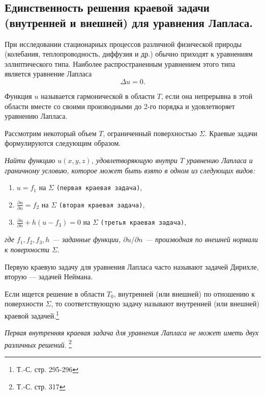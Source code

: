 \subsection{Единственность решения краевой задачи (внутренней и внешней) для уравнения Лапласа.}

При исследовании стационарных процессов различной физической природы (колебания, теплопроводность, диффузия и др.) обычно приходят к уравнениям эллиптического типа. Наиболее распространенным уравнением этого типа является уравнение Лапласа
\begin{equation*}
	\Delta u = 0. 
\end{equation*}

Функция $u$ называется гармонической в области $T$, если она непрерывна в этой области вместе со своими производными до 2-го порядка и удовлетворяет уравнению Лапласа. 

Рассмотрим некоторый объем $T$, ограниченный поверхностью $\Sigma$.
Краевые задачи формулируются следующим образом.

\textit{Найти функцию $u(x, y, z)$, удовлетворяющую внутри $T$ уравнению Лапласа и граничному условию, которое может быть взято в одном из следующих видов:} 
\begin{enumerate}
	\item $u = f_1 $ на $ \Sigma $ \quad \quad \quad \quad \quad \quad \quad \quad \texttt{(первая краевая задача)},
	
	\item $\frac{\partial u}{\partial n} = f_2$ на $ \Sigma $ \quad \quad \quad \quad \quad \quad \quad \texttt{(вторая краевая задача)},
	
	\item $\frac{\partial u}{\partial n} + h(u - f_3) = 0$ на $ \Sigma $ \quad \quad \texttt{(третья краевая задача)},
\end{enumerate}
\textit{где $f_1, f_2, f_3, h$ --- заданные функции, $\partial u / \partial n$ --- производная по внешней нормали к поверхности $\Sigma$}.

Первую краевую задачу для уравнения Лапласа часто называют задачей Дирихле, вторую --- задачей Неймана.

Если ищется решение в области $T_0$, внутренней (или внешней) по отношению к поверхности $\Sigma$, то соответствующую задачу называют внутренней (или внешней) краевой задачей.\footnote{Т.-С. стр. 295-296} 

\textit{Первая внутренняя краевая задача для уравнения Лапласа не может иметь двух различных решений}. \footnote{Т.-С. стр. 317} 


